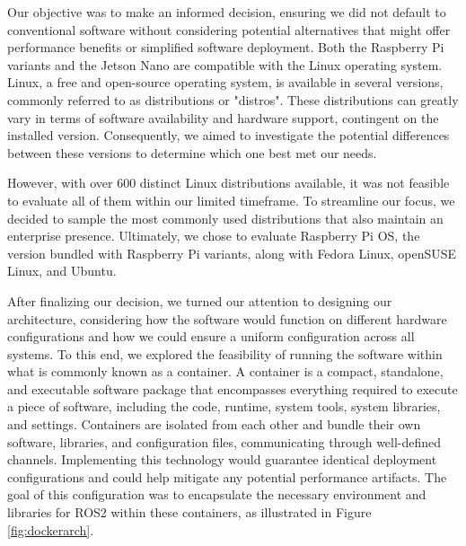 \newpage

Our objective was to make an informed decision, ensuring we did not default to conventional software without considering potential alternatives that might offer performance benefits or simplified software deployment. Both the Raspberry Pi variants and the Jetson Nano are compatible with the Linux operating system. Linux, a free and open-source operating system, is available in several versions, commonly referred to as distributions or "distros". These distributions can greatly vary in terms of software availability and hardware support, contingent on the installed version. Consequently, we aimed to investigate the potential differences between these versions to determine which one best met our needs.

However, with over 600 distinct Linux distributions available, it was not feasible to evaluate all of them within our limited timeframe. To streamline our focus, we decided to sample the most commonly used distributions that also maintain an enterprise presence. Ultimately, we chose to evaluate Raspberry Pi OS, the version bundled with Raspberry Pi variants, along with Fedora Linux, openSUSE Linux, and Ubuntu.\cite{linuxcounter} \\ 

\newpage

After finalizing our decision, we turned our attention to designing our architecture, considering how the software would function on different hardware configurations and how we could ensure a uniform configuration across all systems. To this end, we explored the feasibility of running the software within what is commonly known as a container. A container is a compact, standalone, and executable software package that encompasses everything required to execute a piece of software, including the code, runtime, system tools, system libraries, and settings. Containers are isolated from each other and bundle their own software, libraries, and configuration files, communicating through well-defined channels. Implementing this technology would guarantee identical deployment configurations and could help mitigate any potential performance artifacts. The goal of this configuration was to encapsulate the necessary environment and libraries for ROS2 within these containers, as illustrated in Figure \ref{fig:dockerarch}.\\

